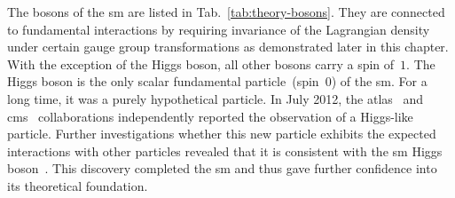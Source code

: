 
The bosons of the \gls{sm} are listed in Tab.~\ref{tab:theory-bosons}. They are connected to fundamental interactions by requiring invariance of the Lagrangian density under certain gauge group transformations as demonstrated later in this chapter. With the exception of the Higgs boson, all other bosons carry a spin of~$1$. The Higgs boson is the only scalar fundamental particle~(spin~$0$) of the \gls{sm}. For a long time, it was a purely hypothetical particle. In July 2012, the \gls{atlas}~\cite{Aad:2012tfa} and \gls{cms}~\cite{Chatrchyan:2012xdj} collaborations independently reported the observation of a Higgs-like particle. Further investigations whether this new particle exhibits the expected interactions with other particles revealed that it is consistent with the \gls{sm} Higgs boson~\cite{Khachatryan:2016vau}. This discovery completed the \gls{sm} and thus gave further confidence into its theoretical foundation.


